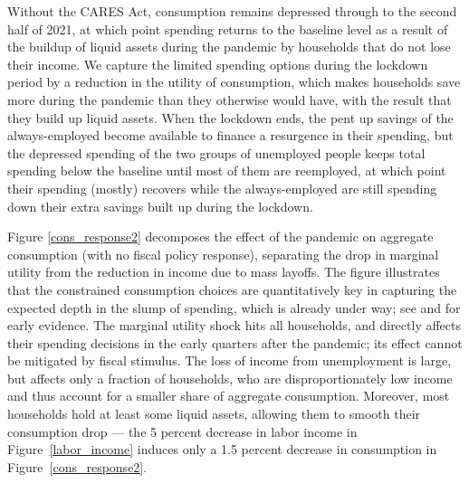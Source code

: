 \documentclass[titlepage,a4paper]{\econtex}
\begin{document}
Without the CARES Act, consumption remains depressed through to the second half of 2021, at which point spending returns to the baseline level as a result of the buildup of liquid assets during the pandemic by households that do not lose their income.
We capture the limited spending options during the lockdown period by a reduction in the utility of consumption, which makes households save more during the pandemic than they otherwise would have, with the result that they build up liquid assets.
When the lockdown ends, the pent up savings of the always-employed become available to finance a resurgence in their spending, but the depressed spending of the two groups of unemployed people keeps total spending below the baseline until most of them are reemployed, at which point their spending (mostly) recovers while the always-employed are still spending down their extra savings built up during the lockdown.

Figure \ref{cons_response2} decomposes the effect of the pandemic on aggregate consumption (with no fiscal policy response), separating the drop in marginal utility from the reduction in income due to mass layoffs.
The figure illustrates that the constrained consumption choices are quantitatively key in capturing the expected depth in the slump of spending, which is already under way; see \cite{baker_Cpandemic} and \cite{nyFedCoronaBlog} for early evidence.
The marginal utility shock hits all households, and directly affects their spending decisions in the early quarters after the pandemic; its effect cannot be mitigated by fiscal stimulus.
The loss of income from unemployment is large, but affects only a fraction of households, who are disproportionately low income and thus account for a smaller share of aggregate consumption.
Moreover, most households hold at least some liquid assets, allowing them to smooth their consumption drop --- the 5 percent  decrease in labor income in Figure~\ref{labor_income} induces only a 1.5 percent decrease in consumption in Figure~\ref{cons_response2}.
\end{document}
